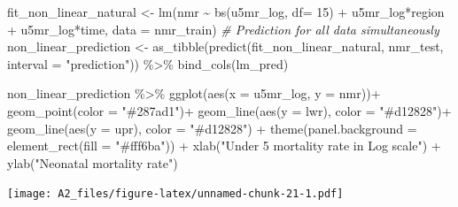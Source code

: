 \documentclass[
]{article}
\newenvironment{Shaded}{\begin{snugshade}}{\end{snugshade}}
\newcommand{\AttributeTok}[1]{\textcolor[rgb]{0.77,0.63,0.00}{#1}}
\newcommand{\CommentTok}[1]{\textcolor[rgb]{0.56,0.35,0.01}{\textit{#1}}}
\newcommand{\DecValTok}[1]{\textcolor[rgb]{0.00,0.00,0.81}{#1}}
\newcommand{\FunctionTok}[1]{\textcolor[rgb]{0.00,0.00,0.00}{#1}}
\newcommand{\NormalTok}[1]{#1}
\newcommand{\OtherTok}[1]{\textcolor[rgb]{0.56,0.35,0.01}{#1}}
\newcommand{\SpecialCharTok}[1]{\textcolor[rgb]{0.00,0.00,0.00}{#1}}
\newcommand{\StringTok}[1]{\textcolor[rgb]{0.31,0.60,0.02}{#1}}
\begin{document}
\begin{Shaded}
\begin{Highlighting}[]
\NormalTok{fit\_non\_linear\_natural }\OtherTok{\textless{}{-}} \FunctionTok{lm}\NormalTok{(nmr }\SpecialCharTok{\textasciitilde{}} \FunctionTok{bs}\NormalTok{(u5mr\_log, }\AttributeTok{df=} \DecValTok{15}\NormalTok{) }\SpecialCharTok{+}\NormalTok{ u5mr\_log}\SpecialCharTok{*}\NormalTok{region }\SpecialCharTok{+}\NormalTok{ u5mr\_log}\SpecialCharTok{*}\NormalTok{time, }\AttributeTok{data =}\NormalTok{ nmr\_train)}
\CommentTok{\# Prediction for all data simultaneously}
\NormalTok{non\_linear\_prediction }\OtherTok{\textless{}{-}} \FunctionTok{as\_tibble}\NormalTok{(}\FunctionTok{predict}\NormalTok{(fit\_non\_linear\_natural, nmr\_test, }\AttributeTok{interval =} \StringTok{"prediction"}\NormalTok{)) }\SpecialCharTok{\%\textgreater{}\%} 
  \FunctionTok{bind\_cols}\NormalTok{(lm\_pred)}

\NormalTok{non\_linear\_prediction }\SpecialCharTok{\%\textgreater{}\%} 
  \FunctionTok{ggplot}\NormalTok{(}\FunctionTok{aes}\NormalTok{(}\AttributeTok{x =}\NormalTok{ u5mr\_log, }\AttributeTok{y =}\NormalTok{ nmr))}\SpecialCharTok{+}
  \FunctionTok{geom\_point}\NormalTok{(}\AttributeTok{color =} \StringTok{"\#287ad1"}\NormalTok{)}\SpecialCharTok{+}
  \FunctionTok{geom\_line}\NormalTok{(}\FunctionTok{aes}\NormalTok{(}\AttributeTok{y =}\NormalTok{ lwr), }\AttributeTok{color =} \StringTok{"\#d12828"}\NormalTok{)}\SpecialCharTok{+}
  \FunctionTok{geom\_line}\NormalTok{(}\FunctionTok{aes}\NormalTok{(}\AttributeTok{y =}\NormalTok{ upr), }\AttributeTok{color =} \StringTok{"\#d12828"}\NormalTok{) }\SpecialCharTok{+}
  \FunctionTok{theme}\NormalTok{(}\AttributeTok{panel.background =} \FunctionTok{element\_rect}\NormalTok{(}\AttributeTok{fill =} \StringTok{"\#fff6ba"}\NormalTok{)) }\SpecialCharTok{+}
  \FunctionTok{xlab}\NormalTok{(}\StringTok{"Under 5 mortality rate in Log scale"}\NormalTok{) }\SpecialCharTok{+}
  \FunctionTok{ylab}\NormalTok{(}\StringTok{"Neonatal mortality rate"}\NormalTok{)}
\end{Highlighting}
\end{Shaded}

\texttt{[image: A2\_files/figure-latex/unnamed-chunk-21-1.pdf]}
\end{document}
